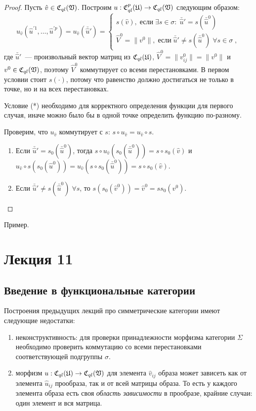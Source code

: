 \documentclass[a4paper, 12pt]{report}
\begin{document}
\begin{proof}
Пусть $\hat{v} \in \mathfrak{C}_{ql}(\mathfrak{V})$. Построим $u: \mathfrak{C}_{ql}^p(\mathfrak{U}) \rightarrow \mathfrak{C}_{ql}(\mathfrak{V})$ следующим образом:
\[
u_{\hat{v}}(\hat{u}^{'1}, \ldots, \hat{u}^{'p}) = u_{\hat{v}}(\bar{\hat{u}}') =
\begin{cases}
s(\hat{v}),\; \text{если}\; \exists s \in \sigma:\; \bar{\hat{u}}' = s(\bar{\hat{u}}^0) \;\\
\hat{V}^0 = \| v^0 \|, \; \text{если}\; \bar{\hat{u}}' \neq s(\bar{\hat{u}}^0)\; \forall s \in \sigma\;,
\end{cases}
\]
где $\bar{\hat{u}}'$~--- произвольный вектор матриц из $\mathfrak{C}_{ql}(\mathfrak{U})$, $\hat{V}^0 = \| v^0_{ij} \| = \| v^0 \|$ и $v^0 \in \mathfrak{C}_{ql}(\mathfrak{V})$, поэтому $\hat{V}^0$ коммутирует со всеми перестановками. В первом условии стоит $s(\cdot)$, потому что равенство должно достигаться не только в точке, но и на всех перестановках.

Условие (*) необходимо для корректного определения функции для первого случая, иначе можно было бы в одной точке определить функцию по-разному.

Проверим, что $u_{\hat{v}}$ коммутирует с $s$: $s \circ u_{\hat{v}} = u_{\hat{v}} \circ s$.
\begin{enumerate}
\item Если $\bar{\hat{u}}' = s_0(\bar{\hat{u}}^0)$, тогда $s \circ u_{\hat{v}}(s_0(\bar{\hat{u}}^0)) = s \circ s_0(\hat{v})$ и $u_{\hat{v}} \circ s(s_0(\hat{u}^0)) = u_{\hat{v}}(s \circ s_0(\bar{\hat{u}}^0)) = s \circ s_0(\hat{v})$.
\item Если $\bar{\hat{u}}' \neq s(\bar{\hat{u}}^0) \; \forall s$, то $s(s_0(\hat{v}^0)) = \hat{v}^0 = ss_0(v^0)$.
\end{enumerate}
\end{proof}
Пример.

\chapter{Лекция 11}
\section{Введение в функциональные категории}
Построения предыдущих лекций про симметрические категории имеют следующие недостатки:
\begin{enumerate}[1)]
\item неконструктивность: для проверки принадлежности морфизма категории $\Sigma$ необходимо проверить коммутацию со всеми перестановками соответствующей подгруппы $\sigma$.
\item морфизм $u: \mathfrak{C}_{ql}(\mathfrak{U}) \rightarrow \mathfrak{C}_{ql}(\mathfrak{V})$ для элемента $\hat{v}_{ij}$ образа может зависеть как от элемента $\hat{u}_{ij}$ прообраза, так и от всей матрицы образа. То есть у каждого элемента образа есть своя \emph{область зависимости} в прообразе, крайние случаи: один элемент и вся матрица.
\end{enumerate}
\end{document}
